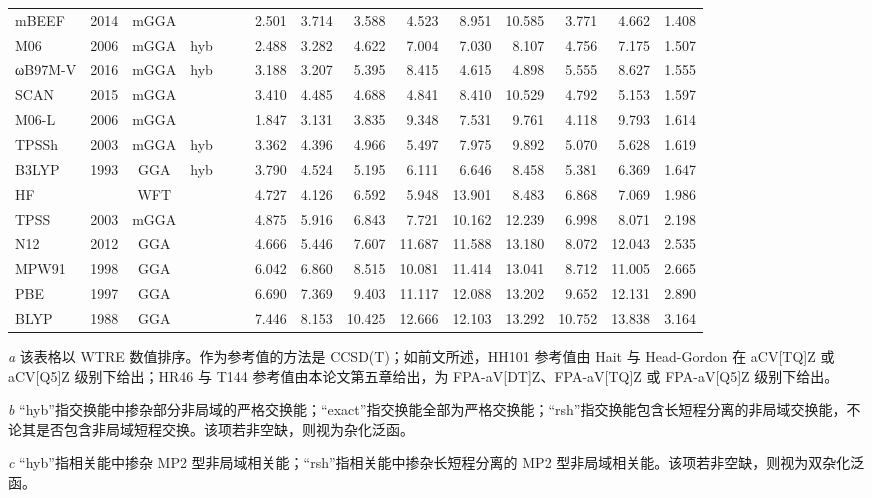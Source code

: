 \begin{landscape}
\begin{longtable}[c]{lcccccrrrrrrrrc}
mBEEF            & 2014 & mGGA &     &     &     & 2.501 & 3.714 & 3.588  & 4.523  & 8.951  & 10.585 & 3.771  & 4.662  & 1.408 \\
M06              & 2006 & mGGA & hyb &     &     & 2.488 & 3.282 & 4.622  & 7.004  & 7.030  & 8.107  & 4.756  & 7.175  & 1.507 \\
ωB97M-V          & 2016 & mGGA & hyb &     &     & 3.188 & 3.207 & 5.395  & 8.415  & 4.615  & 4.898  & 5.555  & 8.627  & 1.555 \\
SCAN             & 2015 & mGGA &     &     &     & 3.410 & 4.485 & 4.688  & 4.841  & 8.410  & 10.529 & 4.792  & 5.153  & 1.597 \\
M06-L            & 2006 & mGGA &     &     &     & 1.847 & 3.131 & 3.835  & 9.348  & 7.531  & 9.761  & 4.118  & 9.793  & 1.614 \\
TPSSh            & 2003 & mGGA & hyb &     &     & 3.362 & 4.396 & 4.966  & 5.497  & 7.975  & 9.892  & 5.070  & 5.628  & 1.619 \\
B3LYP            & 1993 & GGA  & hyb &     &     & 3.790 & 4.524 & 5.195  & 6.111  & 6.646  & 8.458  & 5.381  & 6.369  & 1.647 \\
HF               &      & WFT  &     &     &     & 4.727 & 4.126 & 6.592  & 5.948  & 13.901 & 8.483  & 6.868  & 7.069  & 1.986 \\
TPSS             & 2003 & mGGA &     &     &     & 4.875 & 5.916 & 6.843  & 7.721  & 10.162 & 12.239 & 6.998  & 8.071  & 2.198 \\
N12              & 2012 & GGA  &     &     &     & 4.666 & 5.446 & 7.607  & 11.687 & 11.588 & 13.180 & 8.072  & 12.043 & 2.535 \\
MPW91            & 1998 & GGA  &     &     &     & 6.042 & 6.860 & 8.515  & 10.081 & 11.414 & 13.041 & 8.712  & 11.005 & 2.665 \\
PBE              & 1997 & GGA  &     &     &     & 6.690 & 7.369 & 9.403  & 11.117 & 12.088 & 13.202 & 9.652  & 12.131 & 2.890 \\
BLYP             & 1988 & GGA  &     &     &     & 7.446 & 8.153 & 10.425 & 12.666 & 12.103 & 13.292 & 10.752 & 13.838 & 3.164
\end{longtable}
\vspace{-1em}
\footnotesize
\par\noindent\emph{a} 该表格以 WTRE 数值排序。作为参考值的方法是 CCSD(T)；如前文所述，HH101 参考值由 Hait 与 Head-Gordon 在 aCV[TQ]Z 或 aCV[Q5]Z 级别下给出\cite{Hait-Head-Gordon.PCCP.2018}；HR46 与 T144 参考值由本论文第五章给出，为 FPA-aV[DT]Z、FPA-aV[TQ]Z 或 FPA-aV[Q5]Z 级别下给出。
\par\noindent\emph{b} “hyb”指交换能中掺杂部分非局域的严格交换能；“exact”指交换能全部为严格交换能；“rsh”指交换能包含长短程分离的非局域交换能，不论其是否包含非局域短程交换。该项若非空缺，则视为杂化泛函。
\par\noindent\emph{c} “hyb”指相关能中掺杂 MP2 型非局域相关能；“rsh”指相关能中掺杂长短程分离的 MP2 型非局域相关能。该项若非空缺，则视为双杂化泛函。
\end{landscape}

\endgroup
